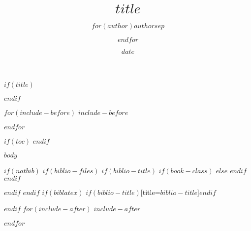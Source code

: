 \documentclass[$if(fontsize)$$fontsize$,$endif$french,openright,twoside,msmallroyalvopaper,
showtrims
]{$documentclass$}
\title{$title$}
\author{$for(author)$$author$$sep$ \and $endfor$}
\date{$date$}
\begin{document}
\pagestyle{empty}

$if(title)$
\pretitle{\begin{center}\LARGE\scshape}
\maketitle
\thispagestyle{empty}
$endif$

$for(include-before)$
$include-before$

$endfor$

\cleartooddpage


\frontmatter

$if(toc)$
{
\hypersetup{linkcolor=black}
  \renewcommand*{\contentsname}{Sommaire}
  \tableofcontents*
}
$endif$


\pagestyle{fancy}

$body$



\cleartooddpage
\begingroup
\renewcommand\numberline[1]{}
\renewcommand\listfigurename{Liste des illustrations}
\listoffigures
\endgroup

\printindex


$if(natbib)$
$if(biblio-files)$
$if(biblio-title)$
$if(book-class)$
\renewcommand\bibname{$biblio-title$}
$else$
\renewcommand\refname{$biblio-title$}
$endif$
$endif$


$endif$
$endif$
$if(biblatex)$
\printbibliography$if(biblio-title)$[title=$biblio-title$]$endif$

$endif$
$for(include-after)$
$include-after$

$endfor$


\end{document}
